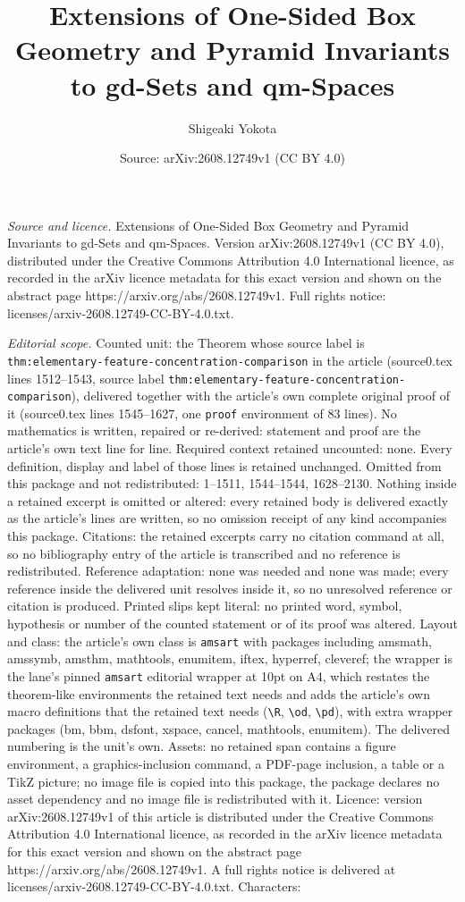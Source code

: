 \documentclass[10pt,a4paper]{amsart}
\title[Extensions of One-Sided Box Geometry and Pyramid Invariants ]{Extensions of One-Sided Box Geometry and Pyramid Invariants to gd-Sets and qm-Spaces}
\author{Shigeaki Yokota}
\date{Source: arXiv:2608.12749v1 (CC BY 4.0)}
\begin{document}
\maketitle

\noindent\emph{Source and licence.} Extensions of One-Sided Box Geometry and Pyramid Invariants to gd-Sets and qm-Spaces. Version arXiv:2608.12749v1 (CC BY 4.0), distributed under the Creative Commons Attribution 4.0 International licence, as recorded in the arXiv licence metadata for this exact version and shown on the abstract page https://arxiv.org/abs/2608.12749v1. Full rights notice: licenses/arxiv-2608.12749-CC-BY-4.0.txt.\par\smallskip

\noindent\textit{Editorial scope.} Counted unit: the Theorem whose source label is \texttt{thm:elementary-feature-concentration-comparison} in the article (source0.tex lines 1512--1543, source label \texttt{thm:elementary-feature-concentration-comparison}), delivered together with the article's own complete original proof of it (source0.tex lines 1545--1627, one \texttt{proof} environment of 83 lines). No mathematics is written, repaired or re-derived: statement and proof are the article's own text line for line. Required context retained uncounted: none. Every definition, display and label of those lines is retained unchanged. Omitted from this package and not redistributed: 1--1511, 1544--1544, 1628--2130. Nothing inside a retained excerpt is omitted or altered: every retained body is delivered exactly as the article's lines are written, so no omission receipt of any kind accompanies this package. Citations: the retained excerpts carry no citation command at all, so no bibliography entry of the article is transcribed and no reference is redistributed. Reference adaptation: none was needed and none was made; every reference inside the delivered unit resolves inside it, so no unresolved reference or citation is produced. Printed slips kept literal: no printed word, symbol, hypothesis or number of the counted statement or of its proof was altered. Layout and class: the article's own class is \texttt{amsart} with packages including amsmath, amssymb, amsthm, mathtools, enumitem, iftex, hyperref, cleveref; the wrapper is the lane's pinned \texttt{amsart} editorial wrapper at 10pt on A4, which restates the theorem-like environments the retained text needs and adds the article's own macro definitions that the retained text needs (\texttt{\textbackslash R}, \texttt{\textbackslash od}, \texttt{\textbackslash pd}), with extra wrapper packages (bm, bbm, dsfont, xspace, cancel, mathtools, enumitem). The delivered numbering is the unit's own. Assets: no retained span contains a figure environment, a graphics-inclusion command, a PDF-page inclusion, a table or a TikZ picture; no image file is copied into this package, the package declares no asset dependency and no image file is redistributed with it. Licence: version arXiv:2608.12749v1 of this article is distributed under the Creative Commons Attribution 4.0 International licence, as recorded in the arXiv licence metadata for this exact version and shown on the abstract page https://arxiv.org/abs/2608.12749v1. A full rights notice is delivered at licenses/arxiv-2608.12749-CC-BY-4.0.txt. Characters: 
\end{document}
